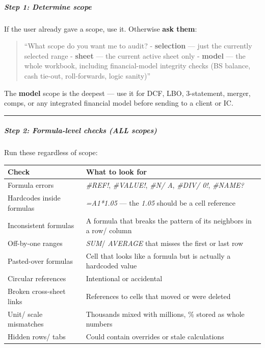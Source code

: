 \documentclass[11pt]{article}
\begin{document}
\subparagraph{Step 1: Determine scope}\mbox{}\par

If the user already gave a scope, use it. Otherwise \textbf{ask them}:


\begin{quote}
``What scope do you want me to audit? - \textbf{selection} — just the currently selected range - \textbf{sheet} — the current active sheet only - \textbf{model} — the whole workbook, including financial-model integrity checks (BS balance, cash tie-out, roll-forwards, logic sanity)''
\end{quote}

The \textbf{model} scope is the deepest — use it for DCF, LBO, 3-statement, merger, comps, or any integrated financial model before sending to a client or IC.


\vspace{0.5em}\hrule\vspace{0.5em}

\subparagraph{Step 2: Formula-level checks (ALL scopes)}\mbox{}\par

Run these regardless of scope:


\begingroup
\small
\setlength{\tabcolsep}{2pt}
\begin{longtable}{>{\RaggedRight\arraybackslash\hspace{0pt}}p{}>{\RaggedRight\arraybackslash\hspace{0pt}}p{}}
\toprule
{} \textbf{Check} & \textbf{What to look for} \\
\midrule
{} Formula errors & \emph{\#REF!}, \emph{\#VALUE!}, \emph{\#N/ A}, \emph{\#DIV/ 0!}, \emph{\#NAME?} \\
{} Hardcodes inside formulas & \emph{=A1*1.05} — the \emph{1.05} should be a cell reference \\
{} Inconsistent formulas & A formula that breaks the pattern of its neighbors in a row/ column \\
{} Off-by-one ranges & \emph{SUM}/ \emph{AVERAGE} that misses the first or last row \\
{} Pasted-over formulas & Cell that looks like a formula but is actually a hardcoded value \\
{} Circular references & Intentional or accidental \\
{} Broken cross-sheet links & References to cells that moved or were deleted \\
{} Unit/ scale mismatches & Thousands mixed with millions, \% stored as whole numbers \\
{} Hidden rows/ tabs & Could contain overrides or stale calculations \\
\bottomrule
\end{longtable}
\endgroup
\end{document}
